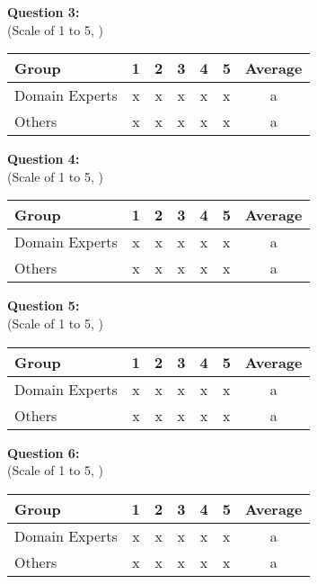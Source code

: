 \noindent\textbf{Question 3: }\\(Scale of 1 to 5, )

\begin{center}
\begin{tabular}{ l c c c c c c }
 Group & 1 & 2 & 3 & 4 & 5 & Average \\ 
 \hline
 Domain Experts & x & x & x & x & x & a \\
 Others 		& x & x & x & x & x & a \\
\end{tabular}
\end{center}

\noindent\textbf{Question 4: }\\(Scale of 1 to 5, )

\begin{center}
\begin{tabular}{ l c c c c c c }
 Group & 1 & 2 & 3 & 4 & 5 & Average \\ 
 \hline
 Domain Experts & x & x & x & x & x & a \\
 Others 		& x & x & x & x & x & a \\
\end{tabular}
\end{center}

\noindent\textbf{Question 5: }\\(Scale of 1 to 5, )

\begin{center}
\begin{tabular}{ l c c c c c c }
 Group & 1 & 2 & 3 & 4 & 5 & Average \\ 
 \hline
 Domain Experts & x & x & x & x & x & a \\
 Others 		& x & x & x & x & x & a \\
\end{tabular}
\end{center}

\noindent\textbf{Question 6: }\\(Scale of 1 to 5, )

\begin{center}
\begin{tabular}{ l c c c c c c }
 Group & 1 & 2 & 3 & 4 & 5 & Average \\ 
 \hline
 Domain Experts & x & x & x & x & x & a \\
 Others 		& x & x & x & x & x & a \\
\end{tabular}
\end{center}

